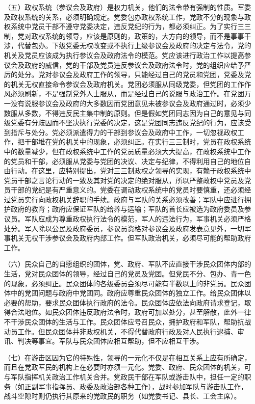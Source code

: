 （五）政权系统（参议会及政府）是权力机关，他们的法令带有强制的性质。军委及政权系统的关系，必须明确规定。党委包办政权系统工作，党政不分的现象与政权系统中党员干部不遵守党委决定，违反党纪的行为，都必须纠正。为了实行三三制，党对政权系统的领导，应该是原则的，政策的，大方向的领导，而不是事事干涉，代替包办。下级党委无权改变或不执行上级参议会及政府的决定与法令，党的机关及党员应该成为执行参议会及政府法令的模范。党应该进行政治工作以提高参议会及政府的威信，党的干部及党员违反参议会及政府法令时，党的组织应给予严厉的处分。党对参议会及政府工作的领导，只能经过自己的党员和党团，党委及党的机关无权直接命令参议会及政府机关。党团必须服从同级党委，但党团的工作作风必须刷新，不是强制党外人士服从，而是经过自己的说服与政治工作。在党团万一没有说服参议会及政府的大多数因而党团意见未被参议会及政府通过时，必须少数服从多数，不得违反民主集中制的原则。但是假如党团同志因为自己的意见与同级党委有分歧因而不坚决执行党委的决定，这是党团同志违反党纪的行为，应该受到指斥与处分。党必须派遣得力的干部到参议会及政府中工作，一切忽视政权工作，把干部堆在党的机关中的现象，必须纠正。在实行三三制时，党员在政权系统中的数量减少，但在政权系统中工作的党员质量必须大大提高，在政权系统中工作的党员和干部，必须服从党委与党团的决议、决定与纪律，不得利用自己的地位自由行动。在这里，应特别提出，党对三三制政权之领导的实现，有赖于政权系统中党员干部之言论行动的一致及其对党的决定的绝对服从，所以严整政权中党员及党员干部的党纪是有严重意义的。党委在调动政权系统中的党员时要慎重，还必须经过党员实行向政权机关辞职的手续。政府与军队的关系必须改善；军队中应进行拥护政府的教育；政府应保证军队的给养与运输；军队的首长应被选为政府委员及参议员。军队应成为尊重政权执行法令的模范，军人的违法行为，军事机关必须严格处分。军人除以公民及政府委员，参议员资格对参议会及政府发表意见外，一切军事机关无权干涉参议会及政府内部工作。但军队政治机关，必须尽可能的帮助政府工作。

（六）民众自己的自愿组织的团体，党、政府、军队不应直接干涉民众团体内部的生活，党对民众团体的领导，经过自己的党员及党团。但党民不分、包办、青一色的现象，必须纠正。民众团体的各级委员会须尽可能有半数以上的非党员。民众团体中的党团问题与政府中党团同。政府应尊重民众团体的独立工作。给民众团体以必要的帮助，要求民众团体执行政府的法令。民众团体应依法向政府请求登记，取得合法地位。如民众团体违反政府法令时，政府可加以处分，甚至解散，此外一律不干涉民众团体的生活与工作。民众团体应号召民众，拥护政府和军队，帮助抗战动员工作。但民众团体并非政权机关，不得代替政府行政及对人民执行逮捕、审讯、判决等事宜。军队与民众团体应相互帮助，但不应相互干涉。

（七）在游击区因为它的特殊性，领导的一元化不仅是在相互关系上应有所确定，而且在党政军民的机构上在必要时亦须一元化。党委、政府、民众团体的机关，可与军队指挥机关政治工作机关合并。党政民干部在军队或游击队中，担任一定的职务（如正副军事指挥员、政委及政治部各种工作），战时参加军队与游击队工作，战斗空隙时则仍执行其原来的党政民的职务（如党委书记、县长、工会主席）。

